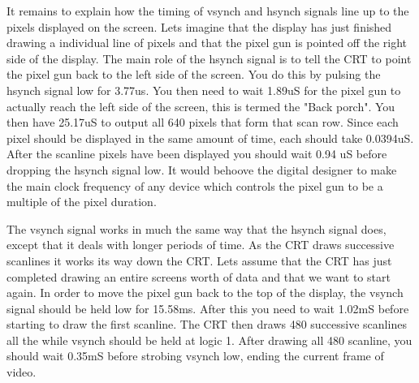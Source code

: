 It remains to explain how the timing of vsynch and hsynch signals 
line up to the pixels displayed on the screen.  Lets imagine that
the display has just finished drawing a individual line of pixels
and that the pixel gun is pointed off the right side of the display.
The main role of the hsynch signal is to tell the CRT to point the
pixel gun back to the left side of the screen.  You do this by pulsing
the hsynch signal low for 3.77us.  You then need to wait 1.89uS for
the pixel gun to actually reach the left side of the screen, this is
termed the "Back porch".  You then have 25.17uS to output all 640 pixels
that form that scan row.  Since each pixel should be displayed in
the same amount of time, each should take 0.0394uS.  After the scanline
pixels have been displayed you should wait 0.94 uS before dropping
the hsynch signal low.  It would behoove the digital designer to make
the main clock frequency of any device which controls the pixel gun to
be a multiple of the pixel duration.

The vsynch signal works in much the same way that the hsynch signal
does, except that it deals with longer periods of time.  As the CRT
draws successive scanlines it works its way down the CRT.  Lets assume
that the CRT has just completed drawing an entire screens worth of
data and that we want to start again.  In order to move the pixel gun
back to the top of the display, the vsynch signal should be held low
for 15.58ms.  After this you need to wait 1.02mS before starting to
draw the first scanline.  The CRT then draws 480 successive scanlines
all the while vsynch should be held at logic 1.  After drawing all 480
scanline, you should wait 0.35mS before strobing vsynch low, ending the
current frame of video.

